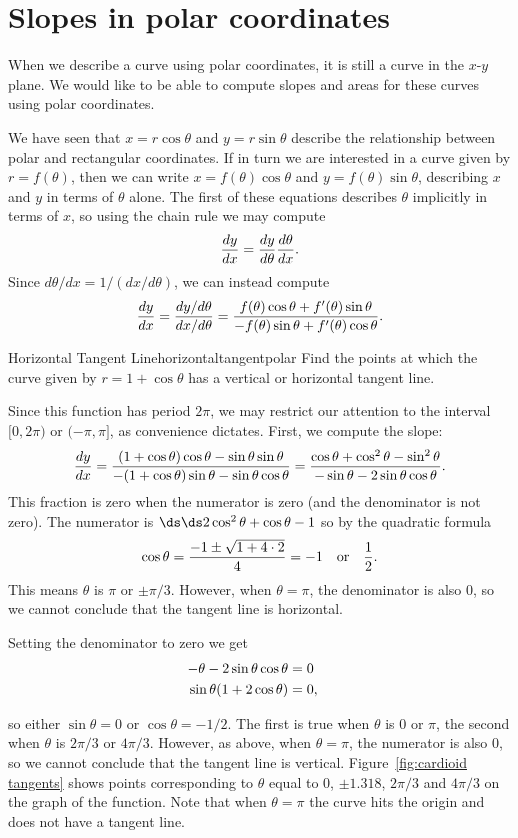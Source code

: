 \section{Slopes in polar coordinates}\label{sec:Slopes in polar coordinates}
When we describe a curve using polar coordinates, it is still a curve
in the $x$-$y$ plane. We would like to be able to compute slopes and
areas for these curves using polar coordinates.

We have seen that $x=r\cos\theta$ and $y=r\sin\theta$ describe the
relationship between polar and rectangular coordinates. If in turn we
are interested in a curve given by $r=f(\theta)$, then we can write
$x=f(\theta)\cos\theta$ and $y=f(\theta)\sin\theta$, describing $x$
and $y$ in terms of $\theta$ alone. The first of these equations
describes $\theta$ implicitly in terms of $x$, so using the chain rule
we may compute
$${dy\over dx}={dy\over d\theta}{d\theta\over dx}.$$
Since $d\theta/dx=1/(dx/d\theta)$, we can instead compute
$$
  {dy\over dx}={dy/d\theta\over dx/d\theta}=
  {f(\theta)\cos\theta + f'(\theta)\sin\theta\over
  -f(\theta)\sin\theta + f'(\theta)\cos\theta}.
$$

\begin{example}{Horizontal Tangent Line}{horizontaltangentpolar}
 Find the points at which the curve given by
$r=1+\cos\theta$ has a vertical or horizontal tangent line. 
\end{example}

\begin{solution}
Since this function has period $2\pi$, we may restrict our attention to the
interval $[0,2\pi)$ or $(-\pi,\pi]$, as convenience dictates.
First, we compute the slope:
$$
  {dy\over dx}={(1+\cos\theta)\cos\theta-\sin\theta\sin\theta\over
    -(1+\cos\theta)\sin\theta-\sin\theta\cos\theta}=
  {\cos\theta+\cos^2\theta-\sin^2\theta\over
    -\sin\theta-2\sin\theta\cos\theta}.
$$
This fraction is zero when the numerator is zero (and the denominator
is not zero). The numerator is $\ds \ds 2\cos^2\theta+\cos\theta-1$ so by the
quadratic formula
$$
  \cos\theta={-1\pm\sqrt{1+4\cdot2}\over 4} = -1 
  \quad\hbox{or}\quad {1\over 2}.
$$
This means $\theta$ is $\pi$ or $\pm \pi/3$.
However, when $\theta=\pi$, the denominator is
also $0$, so we cannot conclude that the tangent line is horizontal. 

Setting the denominator to zero we get
\begin{eqnarray*}
  -\theta-2\sin\theta\cos\theta &= 0\cr
  \sin\theta(1+2\cos\theta)&=0,\cr
\end{eqnarray*}

so either $\sin\theta=0$ or $\cos\theta=-1/2$. The first is true when
$\theta$ is $0$ or $\pi$, the second when $\theta$ is $2\pi/3$ or
$4\pi/3$. However, as above, when $\theta=\pi$, the numerator is also $0$, so we
cannot conclude that the tangent line is
vertical. Figure~\ref{fig:cardioid tangents} shows points
corresponding to $\theta$ equal to $0$, $\pm 1.318$, $2\pi/3$ and
$4\pi/3$ on the graph of the function. Note that when $\theta=\pi$ the
curve hits the origin and does not have a tangent line.
\end{solution}

